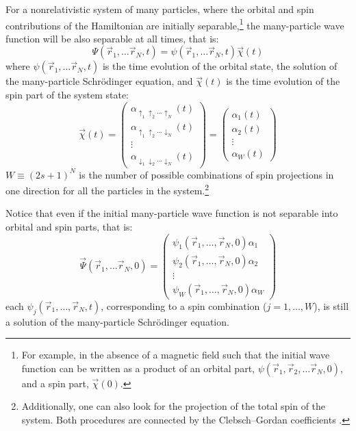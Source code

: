 \documentclass[onecolumn,nofootinbib, secnumarabic, amsmath, nobibnotes,11pt,aps,pra]{revtex4-1}
\begin{document}
For a nonrelativistic system of many particles, where the orbital
and spin contributions of the Hamiltonian are initially separable,\footnote{For
example, in the absence of a magnetic field such that  the initial wave
function can be written as a product of an orbital part, $\psi(\vec
r_1,\vec r_2,\ldots\vec r_N,0)$, and a spin part, $\vec \chi(0)$.}
the many-particle wave function will be also separable at all times,
that is:
\begin{equation}
\label{om.spinND}
\Psi(\vec r_1,\ldots\vec r_N,t) = \psi(\vec r_1,\ldots\vec r_N,t) \vec \chi(t)
\end{equation}
where $\psi(\vec r_1,\ldots\vec r_N,t)$ is the time evolution of the orbital state, the solution of the many-particle Schr\"odinger equation, and $\vec \chi(t)$ is the time evolution of the spin part of the system state:
\begin{equation}
\vec \chi(t) = \left(
\begin{array}{c}
\alpha_{\uparrow_1 \uparrow_2\ldots\uparrow_N}(t) \\ \alpha_{\uparrow_1 \uparrow_2\ldots\downarrow_N}(t) \\ \vdots \\ \alpha_{\downarrow_1 \downarrow_2\ldots\downarrow_N}(t)
\end{array}
\right) = \left(
\begin{array}{c}
\alpha_{1}(t) \\ \alpha_{2}(t) \\ \vdots \\ \alpha_{W}(t)
\end{array}
\right)
\end{equation}
$W \equiv (2s + 1)^N$ is the number of possible combinations of spin
projections in one direction for all the particles in the
system.\footnote{Additionally, one can also
look for the projection of the total spin of the system. Both
procedures are connected by the Clebsch--Gordan coefficients
\cite{om.landaulif}.}

Notice that even if the initial many-particle wave function is not separable into orbital and spin parts, that is:
\begin{equation}
\label{om.spinNDmany}
\vec \Psi(\vec r_1,\ldots\vec r_N,0) = \left(
\begin{array}{c}
\psi_{1}(\vec r_1,\ldots,\vec r_N,0) \alpha_1 \\ \psi_{2}(\vec r_1,\ldots,\vec r_N,0) \alpha_2 \\ \vdots \\ \psi_{W}(\vec r_1,\ldots,\vec r_N,0) \alpha_W
\end{array}
\right)
\end{equation}
each $\psi_{j}(\vec r_1,\ldots,\vec r_N,t)$, corresponding to a spin combination ($j = 1, \ldots, W$), is still a solution of the many-particle Schr\"odinger equation.
\end{document}
